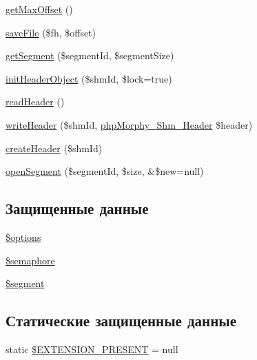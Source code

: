 \begin{DoxyCompactItemize}
\item 
\hyperlink{classphpMorphy__Shm__Cache_aad0b179384ffb6a5b0ddc7dd5a3bf6e1}{getMaxOffset} ()
\item 
\hyperlink{classphpMorphy__Shm__Cache_a93d86079b6f4e802a7b813171640555a}{saveFile} (\$fh, \$offset)
\item 
\hyperlink{classphpMorphy__Shm__Cache_a429277e0c57139165785d378e9e452dc}{getSegment} (\$segmentId, \$segmentSize)
\item 
\hyperlink{classphpMorphy__Shm__Cache_a66514e43c18f71477167b591cdb45c8f}{initHeaderObject} (\$shmId, \$lock=true)
\item 
\hyperlink{classphpMorphy__Shm__Cache_a6a8a595945ff68edce2bc3e3f32addef}{readHeader} ()
\item 
\hyperlink{classphpMorphy__Shm__Cache_a6523180e4d036eb9f2a35a3d443267ed}{writeHeader} (\$shmId, \hyperlink{classphpMorphy__Shm__Header}{phpMorphy\_\-Shm\_\-Header} \$header)
\item 
\hyperlink{classphpMorphy__Shm__Cache_acdb2505a2318aa9bea36be35bc62d20f}{createHeader} (\$shmId)
\item 
\hyperlink{classphpMorphy__Shm__Cache_a6bffdc344c0b138ca9d56a27c1025eb4}{openSegment} (\$segmentId, \$size, \&\$new=null)
\end{DoxyCompactItemize}
\subsection*{Защищенные данные}
\begin{DoxyCompactItemize}
\item 
\hyperlink{classphpMorphy__Shm__Cache_aae62b0c4aa359f3652de3d636066bfed}{\$options}
\item 
\hyperlink{classphpMorphy__Shm__Cache_a5ca640d70ffce9040ca5bd31cf1106ee}{\$semaphore}
\item 
\hyperlink{classphpMorphy__Shm__Cache_a00092fb48031b83b7ed825fefbc80acb}{\$segment}
\end{DoxyCompactItemize}
\subsection*{Статические защищенные данные}
\begin{DoxyCompactItemize}
\item 
static \hyperlink{classphpMorphy__Shm__Cache_a3092c1cf7f622cda0e3ab80a55fdb310}{\$EXTENSION\_\-PRESENT} = null
\end{DoxyCompactItemize}


